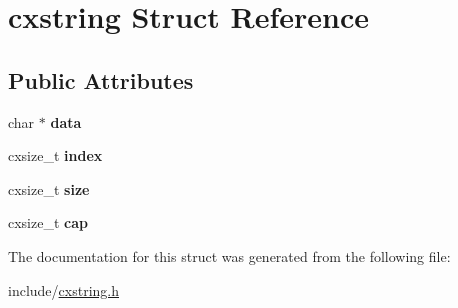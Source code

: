 \hypertarget{structcxstring}{}\section{cxstring Struct Reference}
\label{structcxstring}
\subsection*{Public Attributes}
\begin{DoxyCompactItemize}
\item 
\mbox{\label{structcxstring_adbb4c5b19ff3e49e2da0776d1102da02}} 
char $\ast$ {\bfseries data}
\item 
\mbox{\label{structcxstring_a8ee64de5ade5635f6609c8fd26a3d7ee}} 
cxsize\+\_\+t {\bfseries index}
\item 
\mbox{\label{structcxstring_a98ef2ad0212a946095e90ed9fe16a2d6}} 
cxsize\+\_\+t {\bfseries size}
\item 
\mbox{\label{structcxstring_a38495c5af12925f89ad3a57c06d8fabe}} 
cxsize\+\_\+t {\bfseries cap}
\end{DoxyCompactItemize}


The documentation for this struct was generated from the following file\+:\begin{DoxyCompactItemize}
\item 
include/\hyperlink{cxstring_8h}{cxstring.\+h}\end{DoxyCompactItemize}
